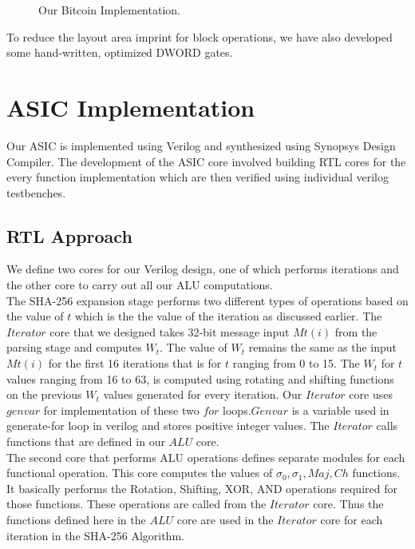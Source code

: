 \begin{figure}[ht]
	\begin{center}
	\end{center}
	\vspace{-2ex}
	\caption{Our Bitcoin Implementation. 
		\label{ourimplementation}}
	\vspace{-2ex}
\end{figure}

To reduce the layout area imprint for block operations, we have also developed some hand-written, optimized DWORD gates. 


\section{ASIC Implementation}
Our ASIC is implemented using Verilog and synthesized using Synopsys Design Compiler. The development of the ASIC core involved building RTL cores for the every function implementation which are then verified using individual verilog testbenches.
\subsection{RTL Approach}
We define two cores for our Verilog design, one of which performs iterations and the other core to carry out all our ALU computations. 
\\The SHA-256 expansion stage performs two different types of operations based on the value of $t$ which is the the value of the iteration as discussed earlier. The $Iterator$ core that we designed takes 32-bit message input $M{t}(i)$ from the parsing stage and computes $W_{t}$. The value of $W_{t}$ remains the same as the input $M{t}(i)$ for the first 16 iterations that is for $t$ ranging from 0 to 15. The $W_{t}$ for $t$ values ranging from 16 to 63, is computed using rotating and shifting functions on the previous $W_{t}$ values generated for every iteration. Our $Iterator$ core uses $genvar$ for implementation of these two $for$ loops.$Genvar$ is a variable used in generate-for loop in verilog and stores positive integer values. The $Iterator$ calls functions that are defined in our $ALU$ core.
\\The second core that performs ALU operations defines separate modules for each functional operation. This core computes the values of $ \sigma_{0}, \sigma_{1}, Maj, Ch $ functions. It basically performs the Rotation, Shifting, XOR, AND operations required for those functions. These operations are called from the $Iterator$ core. Thus the functions defined here in the $ALU$ core are used in the $Iterator$ core for each iteration in the SHA-256 Algorithm.

